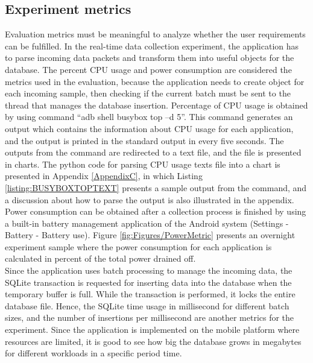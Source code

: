 \subsection{Experiment metrics}
Evaluation metrics must be meaningful to analyze whether the user requirements can be fulfilled. In the real-time data collection experiment, the application has to parse incoming data packets and transform them into useful objects for the database. The percent CPU usage and power consumption are considered the metrics used in the evaluation, because the application needs to create object for each incoming sample, then checking if the current batch must be sent to the thread that manages the database insertion. Percentage of CPU usage is obtained by using command “adb shell busybox top –d 5”. This command generates an output which contains the information about CPU usage for each application, and the output is printed in the standard output in every five seconds. The outputs from the command are redirected to a text file, and the file is presented in charts. The python code for parsing CPU usage texts file into a chart is presented in Appendix \ref{AppendixC}, in which Listing \ref{listing:BUSYBOXTOPTEXT} presents a sample output from the command, and a discussion about how to parse the output is also illustrated in the appendix. Power consumption can be obtained after a collection process is finished by using a built-in battery management application of the Android system (Settings - Battery - Battery use). Figure \ref{fig:Figures/PowerMetric} presents an overnight experiment sample where the power consumption for each application is calculated in percent of the total power drained off.\\
Since the application uses batch processing to manage the incoming data, the SQLite transaction is requested for inserting data into the database when the temporary buffer is full. While the transaction is performed, it locks the entire database file. Hence, the SQLite time usage in millisecond for different batch sizes, and the number of insertions per millisecond are another metrics for the experiment. Since the application is implemented on the mobile platform where resources are limited, it is good to see how big the database grows in megabytes for different workloads in a specific period time.
